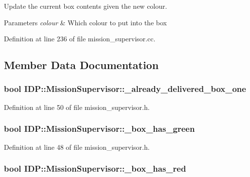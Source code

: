 Update the current box contents given the new colour. 


\begin{DoxyParams}{Parameters}
{\em colour} & Which colour to put into the box \\
\hline
\end{DoxyParams}


Definition at line 236 of file mission\_\-supervisor.cc.



\subsection{Member Data Documentation}
\hypertarget{classIDP_1_1MissionSupervisor_a7a7d76ef314e3da5d18c241f6b24f322}{
\subsubsection[{\_\-already\_\-delivered\_\-box\_\-one}]{\setlength{\rightskip}{0pt plus 5cm}bool {\bf IDP::MissionSupervisor::\_\-already\_\-delivered\_\-box\_\-one}}}
\label{classIDP_1_1MissionSupervisor_a7a7d76ef314e3da5d18c241f6b24f322}


Definition at line 50 of file mission\_\-supervisor.h.

\hypertarget{classIDP_1_1MissionSupervisor_ad1c1d2934e9d4ed0308fc2679db1b31d}{
\subsubsection[{\_\-box\_\-has\_\-green}]{\setlength{\rightskip}{0pt plus 5cm}bool {\bf IDP::MissionSupervisor::\_\-box\_\-has\_\-green}}}
\label{classIDP_1_1MissionSupervisor_ad1c1d2934e9d4ed0308fc2679db1b31d}


Definition at line 48 of file mission\_\-supervisor.h.

\hypertarget{classIDP_1_1MissionSupervisor_a18492ac38ddfaef7c58fefbbdd699099}{
\subsubsection[{\_\-box\_\-has\_\-red}]{\setlength{\rightskip}{0pt plus 5cm}bool {\bf IDP::MissionSupervisor::\_\-box\_\-has\_\-red}}}
\label{classIDP_1_1MissionSupervisor_a18492ac38ddfaef7c58fefbbdd699099}


